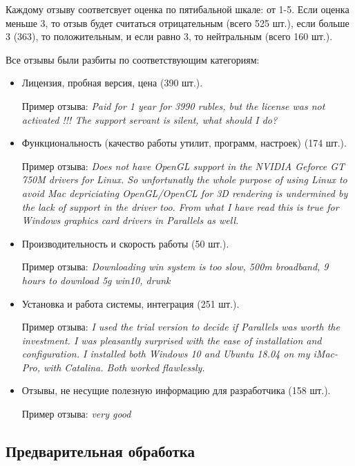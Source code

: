 \documentclass[a4paper,12pt]{article}
\begin{document}
	Каждому отзыву соответсвует оценка по пятибальной шкале: от 1-5. Если оценка меньше 3, то отзыв будет считаться отрицательным (всего 525 шт.), если больше 3 (363), то положительным, и если равно 3, то нейтральным (всего 160 шт.).
	
	Все отзывы были разбиты по соответствующим категориям:
	
	\begin{itemize}
		\item Лицензия, пробная версия, цена (390 шт.).
		
		Пример отзыва: \textit{Paid for 1 year for 3990 rubles, but the license was not activated !!! The support servant is silent, what should I do?}
		
		\item Функциональность (качество работы утилит, программ, настроек) (174 шт.).
		
		Пример отзыва: \textit{Does not have OpenGL support in the NVIDIA Geforce GT 750M drivers for Linux. So unfortunatly the whole purpose of using Linux to avoid Mac depriciating OpenGL/OpenCL for 3D rendering is undermined by the lack of support in the driver too. From what I have read this is true for Windows graphics card drivers in Parallels as well.}
		
		\item Производительность и скорость работы (50 шт.).
		
		Пример отзыва: \textit{Downloading win system is too slow, 500m broadband, 9 hours to download 5g win10, drunk}
		
		\item Установка и работа системы, интеграция (251 шт.).
		
		Пример отзыва: \textit{I used the trial version to decide if Parallels was worth the investment. I was pleasantly surprised with the ease of installation and configuration. I installed both Windows 10 and Ubuntu 18.04 on my iMac-Pro, with Catalina.  Both worked flawlessly.}
		
		\item Отзывы, не несущие полезную информацию для разработчика (158 шт.).
		
		Пример отзыва: \textit{very good}
	\end{itemize}
	
	\subsection{Предварительная обработка}
	
\end{document}
